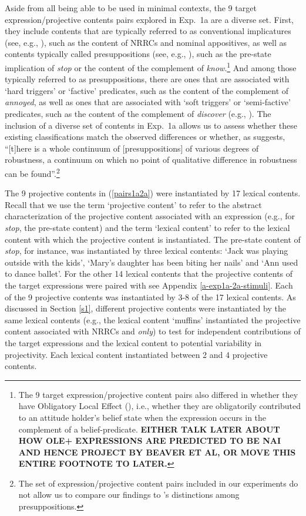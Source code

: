 \documentclass[11pt,fleqn]{article}
\newcommand{\6}{\mbox{$[\hspace*{-.6mm}[$}}
\newcommand{\9}{\mbox{$]\hspace*{-.6mm}]$}}
\newcommand{\citepos}[1]{\citeauthor{#1}'s \citeyear{#1}}
\newcommand{\sectionref}[1]{Section \ref{#1}}
\begin{document}
Aside from all being able to be used in minimal contexts, the 9 target expression/projective contents pairs explored in Exp.~1a are a diverse set. First, they include contents that are typically referred to as conventional implicatures (see, e.g., \citealt{potts05}), such as the content of NRRCs and nominal appositives, as well as contents typically called presuppositions (see, e.g., \citealt{heim83,abrusan2011}), such as the pre-state implication of {\em stop} or the content of the complement of {\em know}.\footnote{The 9 target expression/projective content pairs also differed in whether they have Obligatory Local Effect (\citealt{brst-lang11}), i.e., whether they are obligatorily contributed to an attitude holder's belief state when the expression occurs in the complement of a belief-predicate. {\bf EITHER TALK LATER ABOUT HOW OLE+ EXPRESSIONS ARE PREDICTED TO BE NAI AND HENCE PROJECT BY BEAVER ET AL, OR MOVE THIS ENTIRE FOOTNOTE TO LATER.}} And among those typically referred to as presuppositions, there are ones that are associated with `hard triggers' or `factive' predicates, such as the content of the complement of {\em annoyed}, as well as ones that are associated with `soft triggers' or `semi-factive' predicates, such as the content of the complement of {\em discover} (e.g., \citealt{karttunen71b,simons01,potts05,abusch10,beaver-belly}). The inclusion of a diverse set of contents in Exp.~1a allows us to assess whether these existing classifications match the observed differences or whether, as \citet[223]{kadmon01} suggests, ``[t]here is a whole continuum of [presuppositions] of various degrees of robustness, a continuum on which no point of qualitative difference in robustness can be found''.\footnote{The set of expression/projective content pairs included in our experiments do not allow us to compare our findings to \citepos{zeevat92} distinctions among presuppositions.}

The 9 projective contents in (\ref{pairs1a2a}) were instantiated by 17 lexical contents. Recall that we use the term `projective content' to refer to the abstract characterization of the projective content associated with an expression (e.g., for {\em stop}, the pre-state content) and the term `lexical content' to refer to the lexical content with which the projective content is instantiated. The pre-state content of {\em stop}, for instance, was instantiated by three lexical contents: `Jack was playing outside with the kids', `Mary's daughter has been biting her nails' and `Ann used to dance ballet'. For the other 14 lexical contents that the projective contents of the target expressions were paired with see Appendix \ref{a-exp1a-2a-stimuli}. Each of the 9 projective contents was instantiated by 3-8 of the 17 lexical contents. As discussed in \sectionref{s1}, different projective contents were instantiated by the same lexical contents (e.g., the lexical content `muffins' instantiated the projective content associated with NRRCs and {\em only}) to test for independent contributions of the target expressions and the lexical content to potential variability in projectivity. Each lexical content instantiated between 2 and 4 projective contents.
\end{document}
